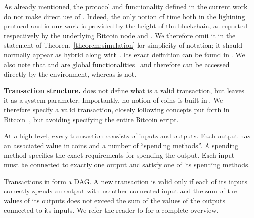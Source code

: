     As already mentioned, the protocol and functionality defined in the current
    work do not make direct use of \Fclock. Indeed, the only notion of time both
    in the lightning protocol and in our work is provided by the height of the
    blockchain, as reported respectively by the underlying Bitcoin node and
    \ledger. We therefore omit it in the statement of
    Theorem~\ref{theorem:simulation} for simplicity of notation; it should
    normally appear as hybrid along with \ledger. Its exact definition can be
    found in . We also note that
    \ledger{} and \Fclock are global functionalities~\cite{globaluc} and
    therefore can be accessed directly by the environment, whereas \fpaynet{} is
    not.

  \noindent \textbf{Transaction structure.}
    \ledger{} does not define what is a valid transaction, but leaves it as a
    system parameter. Importantly, no notion of coins is built in \ledger. We
    therefore specify a valid transaction, closely following concepts put forth
    in Bitcoin~\cite{bitcoin}, but avoiding specifying the entire Bitcoin
    script.

    At a high level, every transaction consists of inputs and outputs. Each
    output has an associated value in coins and a number of ``spending
    methods''. A spending method specifies the exact requirements for spending
    the output. Each input must be connected to exactly one output and satisfy
    one of its spending methods.

    Transactions in \ledger{} form a DAG. A new transaction is valid only if
    each of its inputs correctly spends an output with no other connected input
    and the sum of the values of its outputs does not exceed the sum of the
    values of the outputs connected to its inputs. We refer the reader to
     for a complete overview.

